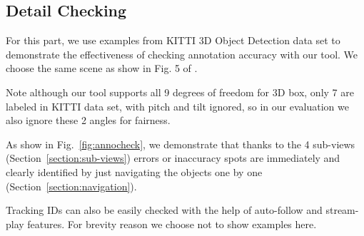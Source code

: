 \documentclass[letterpaper, 10 pt, conference]{ieeeconf}  %
\begin{document}
\subsection{Detail Checking}
For this part, we use examples from KITTI 3D Object Detection data \cite{Geiger2012CVPR} set to demonstrate the effectiveness of checking annotation accuracy with our tool. We choose the same scene as show in  Fig. 5 of \cite{pointatme}.

Note although our tool supports all 9 degrees of freedom for 3D box, only 7 are labeled in KITTI data set, with pitch and tilt ignored, so in our evaluation we also ignore these 2 angles for fairness.

As show in Fig.~\ref{fig:annocheck}, we demonstrate that thanks to the 4 sub-views (Section~\ref{section:sub-views}) errors or inaccuracy spots are immediately and clearly identified by just navigating the objects one by one (Section~\ref{section:navigation}).

Tracking IDs can also be easily checked with the help of auto-follow  and stream-play features. For brevity reason we choose not to show examples here.
\end{document}
